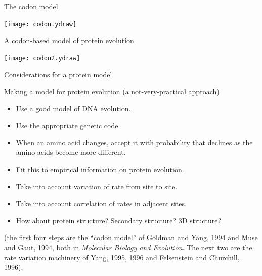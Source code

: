 \documentclass[bluish,slideColor,colorBG,pdf]{prosper}
\begin{document}
\begin{slide}[Replace]{The codon model}

\centerline{\texttt{[image: codon.ydraw]}}

\end{slide}

\begin{slide}[Replace]{A codon-based model of protein evolution}

\centerline{\texttt{[image: codon2.ydraw]}}

\end{slide}

\begin{slide}[Replace]{Considerations for a protein model}

Making a model for protein evolution (a not-very-practical approach)

\begin{itemize}
\item Use a good model of DNA evolution.
\item Use the appropriate genetic code.
\item When an amino acid changes, accept it with probability that declines as
the amino acids become more different.
\item Fit this to empirical information on protein evolution.
\item Take into account variation of rate from site to site.
\item Take into account correlation of rates in adjacent sites.
\item How about protein structure?  Secondary structure? 3D structure?
\end{itemize}

(the first four steps are the ``codon model'' of Goldman and Yang, 1994
and Muse and Gaut, 1994, both in {\it Molecular Biology and Evolution}.
The next two are the rate variation machinery of Yang, 1995, 1996 and
Felsenstein and Churchill, 1996).

\end{slide}
\end{document}
